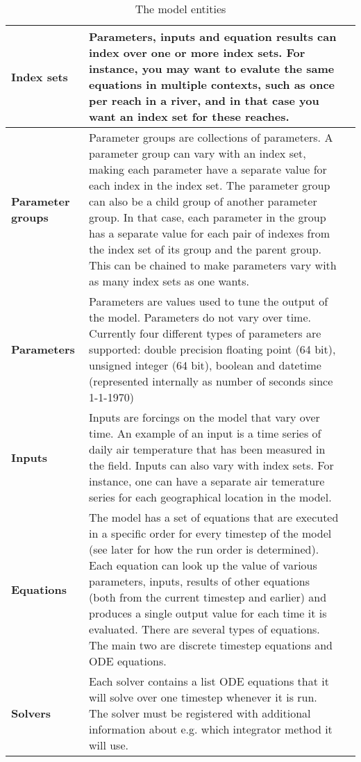 \documentclass[]{memoir}
\begin{document}
\begin{table}[h]
\label{tab:modelentity}
\begin{tabular}{>{\bfseries}l|p{7cm}l}
\hline
Index sets & Parameters, inputs and equation results can index over one or more index sets. For instance, you may want to evalute the same equations in multiple contexts, such as once per reach in a river, and in that case you want an index set for these reaches. \\
\hline
Parameter groups & Parameter groups are collections of parameters. A parameter group can vary with an index set, making each parameter have a separate value for each index in the index set. The parameter group can also be a child group of another parameter group. In that case, each parameter in the group has a separate value for each pair of indexes from the index set of its group and the parent group. This can be chained to make parameters vary with as many index sets as one wants. \\
\hline
Parameters & Parameters are values used to tune the output of the model. Parameters do not vary over time. Currently four different types of parameters are supported: double precision floating point (64 bit), unsigned integer (64 bit), boolean and datetime (represented internally as number of seconds since 1-1-1970) \\
\hline
Inputs & Inputs are forcings on the model that vary over time. An example of an input is a time series of daily air temperature that has been measured in the field. Inputs can also vary with index sets. For instance, one can have a separate air temerature series for each geographical location in the model.\\
\hline
Equations & The model has a set of equations that are executed in a specific order for every timestep of the model (see later for how the run order is determined). Each equation can look up the value of various parameters, inputs, results of other equations (both from the current timestep and earlier) and produces a single output value for each time it is evaluated. There are several types of equations. The main two are discrete timestep equations and ODE equations. \\
\hline
Solvers & Each solver contains a list ODE equations that it will solve over one timestep whenever it is run. The solver must be registered with additional information about e.g. which integrator method it will use. \\
\hline
\end{tabular}
\caption{The model entities}
\end{table}
\end{document}

